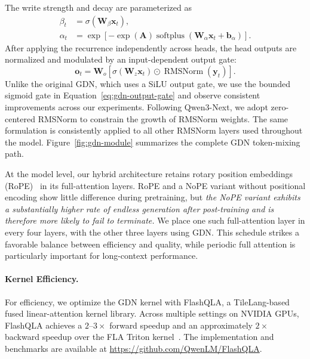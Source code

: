 The write strength and decay are parameterized as
\begin{align}
\beta_t &= \sigma(\bm{W}_{\beta}\bm{x}_t), \\
\alpha_t &= \exp\left[-\exp(\bm{A})
    \operatorname{softplus}(\bm{W}_{\alpha}\bm{x}_t+\bm{b}_{\alpha})\right].
\end{align}
After applying the recurrence independently across heads, the head outputs are normalized and modulated by an input-dependent output gate:
\begin{equation}
\label{eq:gdn-output-gate}
\bm{o}_t = \bm{W}_o\left[
\sigma(\bm{W}_z\bm{x}_t)
\odot \operatorname{RMSNorm}(\bm{y}_t)
\right].
\end{equation}
Unlike the original GDN, which uses a SiLU output gate, we use the bounded sigmoid gate in Equation~\eqref{eq:gdn-output-gate} and observe consistent improvements across our experiments. 
Following Qwen3-Next, we adopt zero-centered RMSNorm to constrain the growth of RMSNorm weights. The same formulation is consistently applied to all other RMSNorm layers used throughout the model.
Figure~\ref{fig:gdn-module} summarizes the complete GDN token-mixing path.

At the model level, our hybrid architecture retains rotary position embeddings (RoPE)~\citep{rope} in its full-attention layers. 
RoPE and a NoPE variant without positional encoding show little difference during pretraining, but \textit{the NoPE variant exhibits a substantially higher rate of endless generation after post-training and is therefore more likely to fail to terminate.}
We place one such full-attention layer in every four layers, with the other three layers using GDN. This schedule strikes a favorable balance between efficiency and quality, while periodic full attention is particularly important for long-context performance.

\paragraph{Kernel Efficiency.}
\label{sec:gdn-efficiency}

For efficiency, we optimize the GDN kernel with FlashQLA, a TileLang-based fused linear-attention kernel library. Across multiple settings on NVIDIA GPUs, FlashQLA achieves a $2$--$3\times$ forward speedup and an approximately $2\times$ backward speedup over the FLA Triton kernel~\citep{yang2024fla}. The implementation and benchmarks are available at \url{https://github.com/QwenLM/FlashQLA}.

